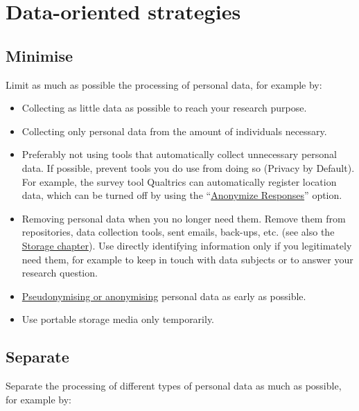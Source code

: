 \documentclass[
]{book}
\providecommand{\tightlist}{%
  \setlength{\itemsep}{0pt}\setlength{\parskip}{0pt}}
\begin{document}
\hypertarget{data-oriented-strategies}{%
\section{Data-oriented strategies}\label{data-oriented-strategies}}

\hypertarget{minimise}{%
\subsection{Minimise}\label{minimise}}

Limit as much as possible the processing of personal data, for example by:

\begin{itemize}
\tightlist
\item
  Collecting as little data as possible to reach your research purpose.
\item
  Collecting only personal data from the amount of individuals necessary.
\item
  Preferably not using tools that automatically collect unnecessary personal
  data. If possible, prevent tools you do use from doing so (Privacy by Default).
  For example, the survey tool Qualtrics can automatically register location data,
  which can be turned off by using the
  ``\href{https://www.qualtrics.com/support/survey-platform/survey-module/survey-options/survey-protection/\#AnonymizingResponses}{Anonymize Responses}''
  option.
\item
  Removing personal data when you no longer need them. Remove them from
  repositories, data collection tools, sent emails, back-ups, etc. (see also the
  \protect\hyperlink{data-storage}{Storage chapter}). Use directly identifying
  information only if you legitimately need them, for example to keep in touch
  with data subjects or to answer your research question.
\item
  \protect\hyperlink{pseudonymisation-anonymisation}{Pseudonymising or anonymising} personal
  data as early as possible.
\item
  Use portable storage media only temporarily.
\end{itemize}

\hypertarget{separate}{%
\subsection{Separate}\label{separate}}

Separate the processing of different types of personal data as much as possible,
for example by:
\end{document}
